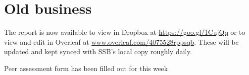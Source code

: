 \documentclass[a4paper,11pt,twoside,class=meetingmins,crop=false]{standalone}
\begin{document}

\maketitle
{}


\section{Old business}
\begin{items}
    \item \priormins
    \item The report is now available to view in Dropbox at \url{https://goo.gl/1CujQq} or to view and edit in Overleaf at \url{www.overleaf.com/4075528rppsqb}. These will be updated and kept synced with SSB's local copy roughly daily.
    \item Peer assessment form has been filled out for this week
\end{items}
\end{document}
